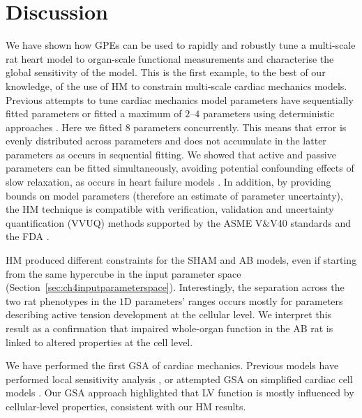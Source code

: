 %
%
%
\section{Discussion}\label{sec:ch4discussion}

\noindent
We have shown how GPEs can be used to rapidly and robustly tune a multi-scale rat heart model to organ-scale functional measurements and characterise the global sensitivity of the model. This is the first example, to the best of our knowledge, of the use of HM to constrain multi-scale cardiac mechanics models. Previous attempts to tune cardiac mechanics model parameters have sequentially fitted parameters \cite{Wang:2009} or fitted a maximum of $2$--$4$ parameters using deterministic approaches \cite{Lewalle:2018}. Here we fitted $8$ parameters concurrently. This means that error is evenly distributed across parameters and does not accumulate in the latter parameters as occurs in sequential fitting. We showed that active and passive parameters can be fitted simultaneously, avoiding potential confounding effects of slow relaxation, as occurs in heart failure models \cite{Xi:2013}. In addition, by providing bounds on model parameters (therefore an estimate of parameter uncertainty), the HM technique is compatible with verification, validation and uncertainty quantification (VVUQ) methods \cite{Patten:2009} supported by the ASME V$\&$V40 standards and the FDA \cite{Asme:2019}.

HM produced different constraints for the SHAM and AB models, even if starting from the same hypercube in the input parameter space (Section~\ref{sec:ch4inputparameterspace}). Interestingly, the separation across the two rat phenotypes in the $1$D parameters' ranges occurs mostly for parameters describing active tension development at the cellular level. We interpret this result as a confirmation that impaired whole-organ function in the AB rat is linked to altered properties at the cell level.

We have performed the first GSA of cardiac mechanics. Previous models have performed local sensitivity analysis \cite{Sher:2013}, or attempted GSA on simplified cardiac cell models \cite{Pathmanathan:2019}. Our GSA approach highlighted that LV function is mostly influenced by cellular-level properties, consistent with our HM results.


%
%
%
